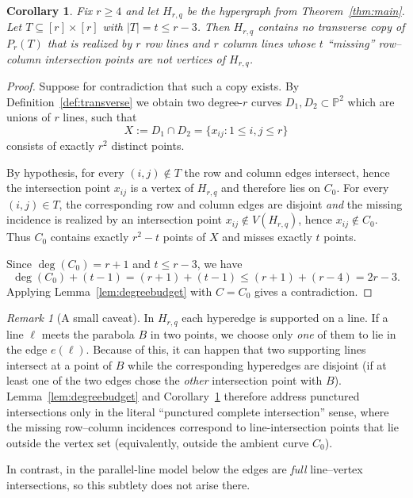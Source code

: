 \documentclass[11pt]{article}
\newtheorem{corollary}[theorem]{Corollary}
\theoremstyle{definition}
\theoremstyle{remark}
\newtheorem{remark}[theorem]{Remark}
\newcommand{\PP}{\mathbb{P}}
\begin{document}
\begin{corollary}\label{cor:Prt-in-main}
Fix $r\ge 4$ and let $H_{r,q}$ be the hypergraph from Theorem~\ref{thm:main}.
Let $T\subseteq [r]\times[r]$ with $|T|=t\le r-3$.
Then $H_{r,q}$ contains no transverse copy of $P_r(T)$ that is realized by $r$ row lines and $r$ column lines
whose $t$ ``missing'' row--column intersection points are not vertices of $H_{r,q}$.
\end{corollary}

\begin{proof}
Suppose for contradiction that such a copy exists.
By Definition~\ref{def:transverse} we obtain two degree-$r$ curves
$D_1,D_2\subset\PP^2$ which are unions of $r$ lines, such that
\[
X:=D_1\cap D_2=\{x_{ij}:1\le i,j\le r\}
\]
consists of exactly $r^2$ distinct points.

By hypothesis, for every $(i,j)\notin T$ the row and column edges intersect, hence the intersection point $x_{ij}$ is a
vertex of $H_{r,q}$ and therefore lies on $C_0$.
For every $(i,j)\in T$, the corresponding row and column edges are disjoint \emph{and} the missing incidence is realized
by an intersection point $x_{ij}\notin V(H_{r,q})$, hence $x_{ij}\notin C_0$.
Thus $C_0$ contains exactly $r^2-t$ points of $X$ and misses exactly $t$ points.

Since $\deg(C_0)=r+1$ and $t\le r-3$, we have
\[
\deg(C_0)+(t-1)=(r+1)+(t-1)\le (r+1)+(r-4)=2r-3.
\]
Applying Lemma~\ref{lem:degreebudget} with $C=C_0$ gives a contradiction.
\end{proof}

\begin{remark}[A small caveat]\label{rem:caveat}
In $H_{r,q}$ each hyperedge is supported on a line.
If a line $\ell$ meets the parabola $B$ in two points, we choose only \emph{one} of them to lie in the edge $e(\ell)$.
Because of this, it can happen that two supporting lines intersect at a point of $B$ while the corresponding
hyperedges are disjoint (if at least one of the two edges chose the \emph{other} intersection point with $B$).
Lemma~\ref{lem:degreebudget} and Corollary~\ref{cor:Prt-in-main} therefore address punctured intersections only in the
literal ``punctured complete intersection'' sense, where the missing row--column incidences correspond to
line-intersection points that lie outside the vertex set (equivalently, outside the ambient curve $C_0$).

In contrast, in the parallel-line model below the edges are \emph{full} line--vertex intersections, so this subtlety
does not arise there.
\end{remark}
\end{document}
